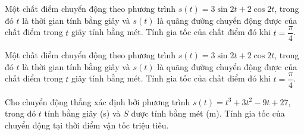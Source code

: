 \begin{bt}%
	Một chất điểm chuyển động theo phương trình $s(t)=3 \sin 2 t+2 \cos 2 t$, trong đó $t$ là thời gian tính bằng giây và $s(t)$ là quãng đường chuyển động được của chất điểm trong $t$ giây tính bằng mét. Tính gia tốc của chất điểm đó khi  $t=\dfrac{\pi}{4}$.
\end{bt}

\begin{ex}%
	Một chất điểm chuyển động  theo phương trình $s(t)=3 \sin 2 t+2 \cos 2 t$, trong đó $t$ là thời gian tính bằng giây và $s(t)$ là quãng đường chuyển động được của chất điểm trong $t$ giây tính bằng mét. Tính gia tốc của chất điểm đó khi $t=\dfrac{\pi}{4}$.
\end{ex}

\begin{bt}%
	Cho chuyển động thẳng xác định bởi phương trình $s(t)=t^3+3t^2-9t+27$, trong đó $t$ tính bằng giây (s) và $S$ được tính bằng mét (m). Tính gia tốc của chuyển động tại thời điểm vận tốc triệu tiêu.
\end{bt}

